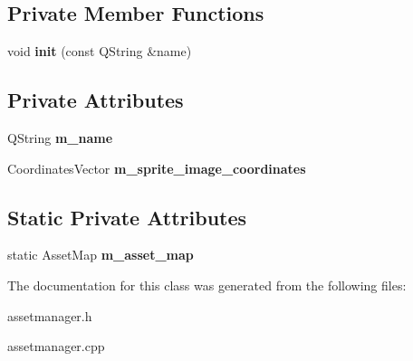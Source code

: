 \subsection*{Private Member Functions}
\begin{DoxyCompactItemize}
\item 
\mbox{\label{class_asset_manager_aa1d50ebdf4aa6df6fba090e649eb6ec0}} 
void {\bfseries init} (const Q\+String \&name)
\end{DoxyCompactItemize}
\subsection*{Private Attributes}
\begin{DoxyCompactItemize}
\item 
\mbox{\label{class_asset_manager_a64d1471c74b7bcd96ebc04e4a3458d54}} 
Q\+String {\bfseries m\+\_\+name}
\item 
\mbox{\label{class_asset_manager_af8c2ecb2870be050880deed6d55f5332}} 
Coordinates\+Vector {\bfseries m\+\_\+sprite\+\_\+image\+\_\+coordinates}
\end{DoxyCompactItemize}
\subsection*{Static Private Attributes}
\begin{DoxyCompactItemize}
\item 
\mbox{\label{class_asset_manager_a8c7dee0564fcd582ae15c299afa758f2}} 
static Asset\+Map {\bfseries m\+\_\+asset\+\_\+map}
\end{DoxyCompactItemize}


The documentation for this class was generated from the following files\+:\begin{DoxyCompactItemize}
\item 
assetmanager.\+h\item 
assetmanager.\+cpp\end{DoxyCompactItemize}
